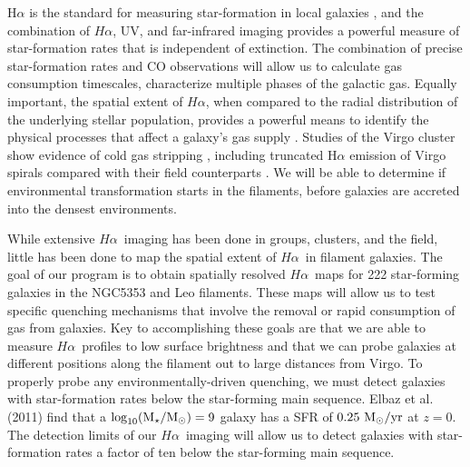 \documentclass[11pt, preprint]{aastex}
\newcommand{\ha}{$H\alpha$}
\begin{document}
H$\alpha$ is the standard for measuring star-formation in local galaxies
\citep[e.g.][]{kennicutt98}, and the combination of \ha, UV, 
and far-infrared imaging provides a powerful measure of star-formation
rates that is independent of extinction.  The
combination of precise star-formation rates and CO observations will allow us to calculate
gas consumption timescales, characterize multiple phases of the
galactic gas. 
Equally important, the spatial extent of \ha, when compared to the
radial distribution of the underlying stellar population, provides a powerful
means to identify the physical processes that affect a galaxy's gas
supply \citep[e.g.][]{hodge83, dale01, gavazzi12,boselli15}.
Studies of the Virgo cluster show evidence of cold gas stripping
\citep[e.g.][]{koopmann98, koopmann04, dale01, crowl05, chung07,
  corbelli12, gavazzi12, boselli15}, including truncated H$\alpha$ emission of Virgo spirals
compared with their field counterparts \citep{koopmann04}.
We will be able to determine if environmental transformation starts in
the filaments, before galaxies are accreted into the densest environments.

While extensive \ha \ imaging has been done in groups, clusters, and the field,
little has been done to map the spatial extent of \ha \ in filament
galaxies.  
The goal of our program is to obtain spatially resolved \ha \ maps for 222 star-forming galaxies in
the NGC5353 and Leo filaments. These maps will allow us to test specific quenching
mechanisms that involve the removal or rapid consumption of gas from galaxies. Key to accomplishing
these goals are that we are able to measure \ha \ profiles to low surface brightness and that we can
probe galaxies at different positions along the filament out to large
distances from Virgo.
To properly probe any environmentally-driven quenching, we must detect galaxies
with star-formation rates below the star-forming main sequence. Elbaz et al. (2011) find that a
$\rm \log_{10}(M_\star/M_\odot) = 9$ galaxy has a SFR 
of $\rm 0.25~ M_\odot/yr$ at $z = 0$. 
The detection limits of our \ha \ imaging will allow us to detect galaxies with star-formation rates a
factor of ten below the star-forming main sequence.
\end{document}
